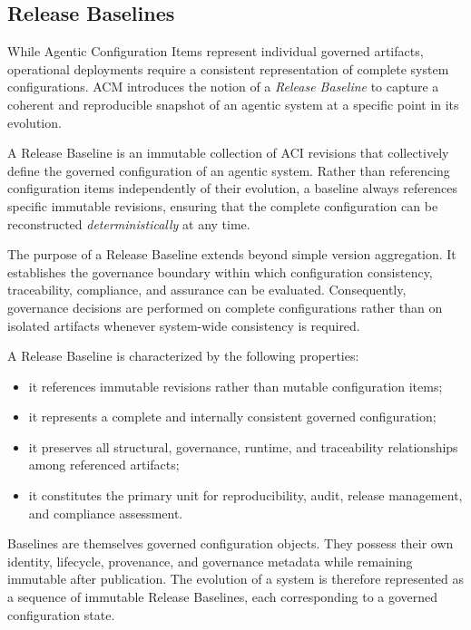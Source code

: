 \documentclass[10pt]{article}
\begin{document}
\subsection{Release Baselines}
\label{sec:release_baselines}

While Agentic Configuration Items represent individual governed artifacts, operational deployments require a consistent representation of complete system configurations. ACM introduces the notion of a \emph{Release Baseline} to capture a coherent and reproducible snapshot of an agentic system at a specific point in its evolution.

A Release Baseline is an immutable collection of ACI revisions that collectively define the governed configuration of an agentic system. Rather than referencing configuration items independently of their evolution, a baseline always references specific immutable revisions, ensuring that the complete configuration can be reconstructed \emph{deterministically} at any time.

The purpose of a Release Baseline extends beyond simple version aggregation. It establishes the governance boundary within which configuration consistency, traceability, compliance, and assurance can be evaluated. Consequently, governance decisions are performed on complete configurations rather than on isolated artifacts whenever system-wide consistency is required.

A Release Baseline is characterized by the following properties:

\begin{itemize}

\item it references immutable revisions rather than mutable configuration items;

\item it represents a complete and internally consistent governed configuration;

\item it preserves all structural, governance, runtime, and traceability relationships among referenced artifacts;

\item it constitutes the primary unit for reproducibility, audit, release management, and compliance assessment.

\end{itemize}

Baselines are themselves governed configuration objects. They possess their own identity, lifecycle, provenance, and governance metadata while remaining immutable after publication. The evolution of a system is therefore represented as a sequence of immutable Release Baselines, each corresponding to a governed configuration state.
\end{document}
